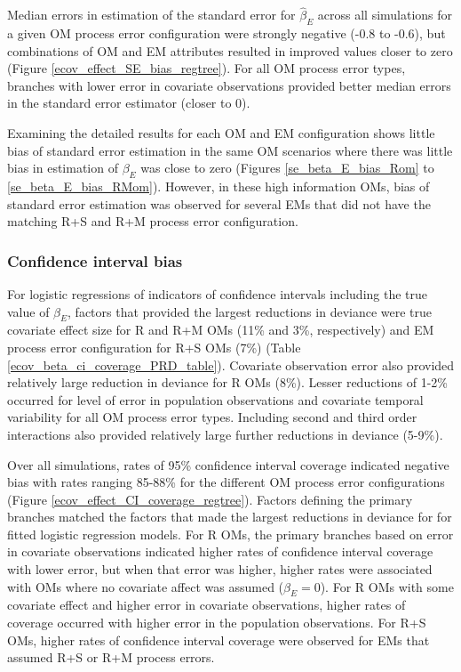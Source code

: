 \documentclass[
  12pt,
]{article}
\begin{document}
Median errors in estimation of the standard error for \(\widehat \beta_E\) across all simulations for a given OM process error configuration were strongly negative (-0.8 to -0.6), but combinations of OM and EM attributes resulted in improved values closer to zero (Figure \ref{ecov_effect_SE_bias_regtree}). For all OM process error types, branches with lower error in covariate observations provided better median errors in the standard error estimator (closer to 0).

Examining the detailed results for each OM and EM configuration shows little bias of standard error estimation in the same OM scenarios where there was little bias in estimation of \(\beta_E\) was close to zero (Figures \ref{se_beta_E_bias_Rom} to \ref{se_beta_E_bias_RMom}). However, in these high information OMs, bias of standard error estimation was observed for several EMs that did not have the matching R+S and R+M process error configuration.

\subsubsection*{Confidence interval bias}\label{confidence-interval-bias}

For logistic regressions of indicators of confidence intervals including the true value of \(\beta_E\), factors that provided the largest reductions in deviance were true covariate effect size for R and R+M OMs (11\% and 3\%, respectively) and EM process error configuration for R+S OMs (7\%) (Table \ref{ecov_beta_ci_coverage_PRD_table}). Covariate observation error also provided relatively large reduction in deviance for R OMs (8\%). Lesser reductions of 1-2\% occurred for level of error in population observations and covariate temporal variability for all OM process error types. Including second and third order interactions also provided relatively large further reductions in deviance (5-9\%).

Over all simulations, rates of 95\% confidence interval coverage indicated negative bias with rates ranging 85-88\% for the different OM process error configurations (Figure \ref{ecov_effect_CI_coverage_regtree}). Factors defining the primary branches matched the factors that made the largest reductions in deviance for for fitted logistic regression models. For R OMs, the primary branches based on error in covariate observations indicated higher rates of confidence interval coverage with lower error, but when that error was higher, higher rates were associated with OMs where no covariate affect was assumed (\(\beta_E = 0\)). For R OMs with some covariate effect and higher error in covariate observations, higher rates of coverage occurred with higher error in the population observations. For R+S OMs, higher rates of confidence interval coverage were observed for EMs that assumed R+S or R+M process errors.
\end{document}
